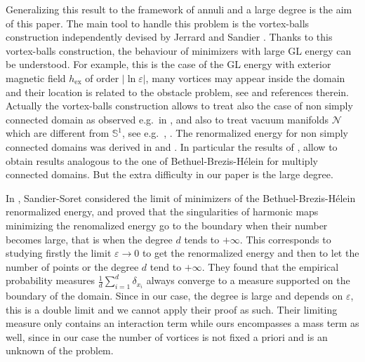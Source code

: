 \documentclass[12pt,reqno]{amsart}
\def\e {{\varepsilon}}
\numberwithin{equation}{section}
\begin{document}
 Generalizing this result to the framework of annuli and a large degree is the aim of this paper. 
 The main tool to handle this problem is the vortex-balls construction independently devised by Jerrard \cite{Jerrard_1999} and Sandier \cite{Sandier_1998}. Thanks to this vortex-balls construction, the behaviour of minimizers with large GL energy can be understood. For example, this is the case of the GL energy  with exterior magnetic field \(h_{\text{ex}}\) of order \(|\ln \e|\), many vortices may appear inside the domain and their location is related to the obstacle problem, see \cite{Sandier_Serfaty_2007} and references therein. Actually the vortex-balls construction allows to treat also the case of non simply connected domain as observed e.g.\ in \cite{Jerrard_Soner_2002}, \cite{Alama_Bronsard_2006} and also to treat vacuum manifolds \(\mathcal{N}\) which are different from \(\mathbb{S}^1\), see e.g.\ \cite{Monteil_Rodiac_VanSchaftingen_2021}, \cite{Monteil_Rodiac_VanSchaftingen_2022}. The renormalized energy for non simply connected domains was derived in \cite{delPino_Kowalczyk_Musso_2006} and \cite{Rodiac_Ubillus_2022}. In particular the results of \cite{Monteil_Rodiac_VanSchaftingen_2021,Monteil_Rodiac_VanSchaftingen_2022,Rodiac_Ubillus_2022}, allow to obtain results analogous to the one of Bethuel-Brezis-Hélein \cite{BBH} for multiply connected domains. But the extra difficulty in our paper is the large degree.

In \cite{Sandier_Soret_2000}, Sandier-Soret considered the limit of minimizers of the Bethuel-Brezis-Hélein renormalized energy, and proved that the singularities of harmonic maps 
minimizing the renomalized energy go to the boundary when their number becomes large, that is when the degree  $d$ tends to \(+\infty\). This corresponds to studying firstly the  limit \(\e\to 0\)  to get the renormalized energy and then to let the number of points or the degree $d$ tend to \( +\infty\). They found  that the empirical probability measures \(\frac{1}{d}\sum_{i=1}^d \delta_{x_i}\) always converge to a measure supported on the boundary of the domain. Since in our case, the degree is large and depends on $\e$, this is a double limit and we cannot apply their proof as such. Their limiting measure only contains an interaction term while ours encompasses a mass term as well, since in our case the number of vortices is not fixed a priori and is an unknown of the problem.  
\end{document}

